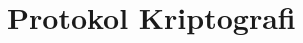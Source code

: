 \documentclass[../buku_kriptografi.tex]{subfiles}
\begin{document}
\ifdefined\InMainDocument\else\setcounter{chapter}{10}\fi

\chapter{Protokol Kriptografi}






\ifdefined\InMainDocument\else


\fi
\end{document}
